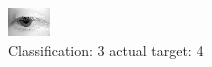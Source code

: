 \begin{figure}[h!]
\begin{center}
\includegraphics[width=0.60\columnwidth]{figures/ID2579_class_3_target_4.png}
\end{center}
\caption{ Classification: 3 actual target: 4}
\label{fig:ID2579_class_3_target_4}
\end{figure}
